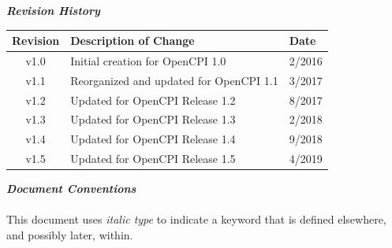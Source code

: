 \maketitle
\newpage
\begin{center}
  \textit{\textbf{Revision History}}
  \begin{table}[H]
    \begin{tabularx}{\textwidth}{|c|X|l|}
      \hline
      \rowcolor{blue}
      \textbf{Revision} & \textbf{Description of Change} & \textbf{Date} \\
      \hline
      v1.0 & Initial creation for OpenCPI 1.0 & 2/2016 \\
      \hline
      v1.1 & Reorganized and updated for OpenCPI 1.1 & 3/2017 \\
      \hline
      v1.2 & Updated for OpenCPI Release 1.2 & 8/2017 \\
      \hline
      v1.3 & Updated for OpenCPI Release 1.3 & 2/2018 \\
      \hline
      v1.4 & Updated for OpenCPI Release 1.4 & 9/2018 \\
      \hline
      v1.5 & Updated for OpenCPI Release 1.5 & 4/2019 \\
      \hline
    \end{tabularx}
  \end{table}
  \par
  \textit{\textbf{Document Conventions}}\\
  ~\\
  This document uses \textit{italic type} to indicate a keyword that is defined elsewhere, and possibly later, within.
\end{center}
\newpage
